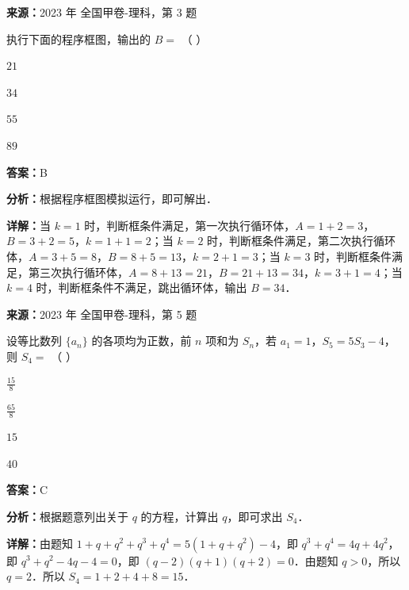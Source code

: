 \begin{question}[points=5]
\textbf{来源：}2023 年 全国甲卷-理科，第 3 题\par
执行下面的程序框图，输出的 $B = $ （                         ）
\begin{choices}
  \item $21$
  \item $34$
  \item $55$
  \item $89$
\end{choices}
\begin{solution}
\textbf{答案：}B

\textbf{分析：}根据程序框图模拟运行，即可解出．

\textbf{详解：}当 $k = 1$ 时，判断框条件满足，第一次执行循环体，$A = 1 + 2 = 3$，$B = 3 + 2 = 5$，$k = 1 + 1 = 2$；当 $k = 2$ 时，判断框条件满足，第二次执行循环体，$A = 3 + 5 = 8$，$B = 8 + 5 = 13$，$k = 2 + 1 = 3$；当 $k = 3$ 时，判断框条件满足，第三次执行循环体，$A = 8 + 13 = 21$，$B = 21 + 13 = 34$，$k = 3 + 1 = 4$；当 $k = 4$ 时，判断框条件不满足，跳出循环体，输出 $B = 34$．
\end{solution}
\end{question}

\begin{question}[points=5]
\textbf{来源：}2023 年 全国甲卷-理科，第 5 题\par
设等比数列 $\{a_n\}$ 的各项均为正数，前 $n$ 项和为 $S_n$，若 $a_1 = 1$，$S_5 = 5S_3 - 4$，则 $S_4 = $ （                         ）
\begin{choices}
  \item $\frac{15}{8}$
  \item $\frac{65}{8}$
  \item $15$
  \item $40$
\end{choices}
\begin{solution}
\textbf{答案：}C

\textbf{分析：}根据题意列出关于 $q$ 的方程，计算出 $q$，即可求出 $S_4$．

\textbf{详解：}由题知 $1 + q + q^2 + q^3 + q^4 = 5(1 + q + q^2) - 4$，即 $q^3 + q^4 = 4q + 4q^2$，即 $q^3 + q^2 - 4q - 4 = 0$，即 $(q - 2)(q + 1)(q + 2) = 0$．由题知 $q > 0$，所以 $q = 2$．所以 $S_4 = 1 + 2 + 4 + 8 = 15$．
\end{solution}
\end{question}

